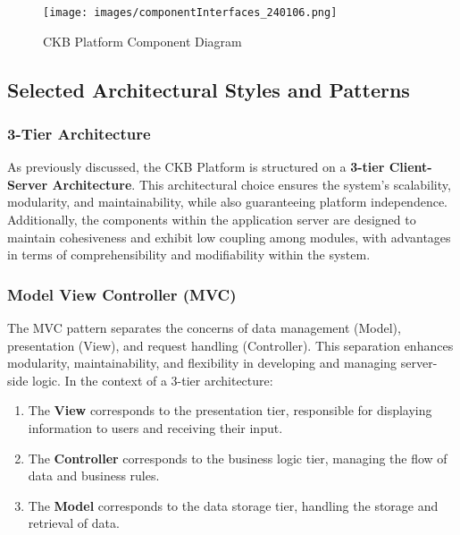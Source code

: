 \documentclass[a4paper, 11pt, titlepage]{article}
\begin{document}
\begin{figure}[H]
  \texttt{[image: images/componentInterfaces\_240106.png]}
  \caption{CKB Platform Component Diagram}
  \label{fig:CKB_component2}
  \centering
\end{figure}

\newpage

\subsection{Selected Architectural Styles and Patterns}

\subsubsection*{3-Tier Architecture}
As previously discussed, the CKB Platform is structured on a \textbf{3-tier Client-Server Architecture}. This architectural choice ensures the system's scalability, modularity, and maintainability, while also guaranteeing platform independence. Additionally, the components within the application server are designed to maintain cohesiveness and exhibit low coupling among modules, with advantages in terms of comprehensibility and modifiability within the system.

\subsubsection*{Model View Controller (MVC)}
The MVC pattern separates the concerns of data management (Model), presentation (View), and request handling (Controller). This separation enhances modularity, maintainability, and flexibility in developing and managing server-side logic.
In the context of a 3-tier architecture:
\begin{enumerate}
  \item The \textbf{View} corresponds to the presentation tier, responsible for displaying information to users and receiving their input.
  \item The \textbf{Controller} corresponds to the business logic tier, managing the flow of data and business rules.
  \item The \textbf{Model} corresponds to the data storage tier, handling the storage and retrieval of data.
\end{enumerate}
\end{document}
